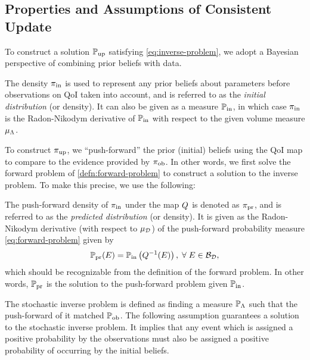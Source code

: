 \subsection{Properties and Assumptions of Consistent Update}\label{sec:properties}

To construct a solution $\operatorname*{\mathbb{P}_{up}}$ satisfying \eqref{eq:inverse-problem}, we adopt a Bayesian perspective of combining prior beliefs with data.

\begin{defn}\label{defn:initial}
  The density $\operatorname*{\pi_{in}}$ is used to represent any prior beliefs about parameters before observations on QoI taken into account, and is referred to as the \emph{initial distribution} (or density).
  It can also be given as a measure $\operatorname*{\mathbb{P}_{in}}$, in which case $\operatorname*{\pi_{in}}$ is the Radon-Nikodym derivative of $\operatorname*{\mathbb{P}_{in}}$ with respect to the given volume measure $\mu_{{\Lambda}}$.
\end{defn}

To construct $\operatorname*{\pi_{up}}$, we ``push-forward'' the prior (initial) beliefs using the QoI map to compare to the evidence provided by $\operatorname*{\pi_{ob}}$.
In other words, we first solve the forward problem of \eqref{defn:forward-problem} to construct a solution to the inverse problem.
To make this precise, we use the following:

\begin{defn}\label{defn:predicted}
  The push-forward density of $\operatorname*{\pi_{in}}$ under the map $Q$ is denoted as $\operatorname*{\pi_{pr}}$, and is referred to as the \emph{predicted distribution} (or density).
  It is given as the Radon-Nikodym derivative (with respect to $\mu_{\mathcal{D}}$) of the push-forward probability measure \eqref{eq:forward-problem} given by
  \begin{equation}\label{eq:predicted}
    \operatorname*{\mathbb{P}_{pr}} (E) = \operatorname*{\mathbb{P}_{in}} \left ( Q^{-1}(E) \right ), \; \forall \; E \in \mathcal{B}_{\mathcal{D}},
  \end{equation}
  which should be recognizable from the definition of the forward problem.
  In other words, $\operatorname*{\mathbb{P}_{pr}}$ is the solution to the push-forward problem given $\operatorname*{\mathbb{P}_{in}}$.
\end{defn}


The stochastic inverse problem is defined as finding a measure $\mathbb{P}_{\Lambda}$ such that the push-forward of it matched $\operatorname*{\mathbb{P}_{ob}}$.
The following assumption guarantees a solution to the stochastic inverse problem.
It implies that any event which is assigned a positive probability by the observations must also be assigned a positive probability of occurring by the initial beliefs.

